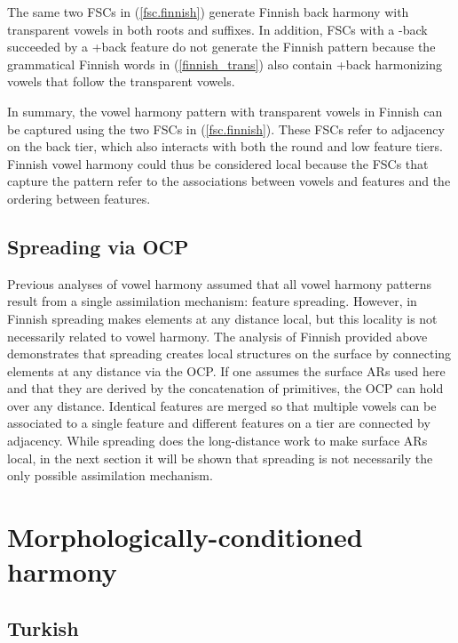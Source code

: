 \documentclass[,doc,floatsintext]{apa6}
\theoremstyle{definition}
\theoremstyle{definition}
\theoremstyle{definition}
\theoremstyle{remark}
\begin{document}
\noindent The same two FSCs in (\ref{fsc.finnish}) generate Finnish back
harmony with transparent vowels in both roots and suffixes. In addition,
FSCs with a -back succeeded by a +back feature do not generate the
Finnish pattern because the grammatical Finnish words in
(\ref{finnish_trans}) also contain +back harmonizing vowels that follow
the transparent vowels.

In summary, the vowel harmony pattern with transparent vowels in Finnish
can be captured using the two FSCs in (\ref{fsc.finnish}). These FSCs
refer to adjacency on the back tier, which also interacts with both the
round and low feature tiers. Finnish vowel harmony could thus be
considered local because the FSCs that capture the pattern refer to the
associations between vowels and features and the ordering between
features.

\subsection{Spreading via OCP}\label{spreading-via-ocp}

Previous analyses of vowel harmony assumed that all vowel harmony
patterns result from a single assimilation mechanism: feature spreading.
However, in Finnish spreading makes elements at any distance local, but
this locality is not necessarily related to vowel harmony. The analysis
of Finnish provided above demonstrates that spreading creates local
structures on the surface by connecting elements at any distance via the
OCP. If one assumes the surface ARs used here and that they are derived
by the concatenation of primitives, the OCP can hold over any distance.
Identical features are merged so that multiple vowels can be associated
to a single feature and different features on a tier are connected by
adjacency. While spreading does the long-distance work to make surface
ARs local, in the next section it will be shown that spreading is not
necessarily the only possible assimilation mechanism.

\section{Morphologically-conditioned
harmony}\label{morphologically-conditioned-harmony}

\subsection{Turkish}\label{turkish}
\end{document}
